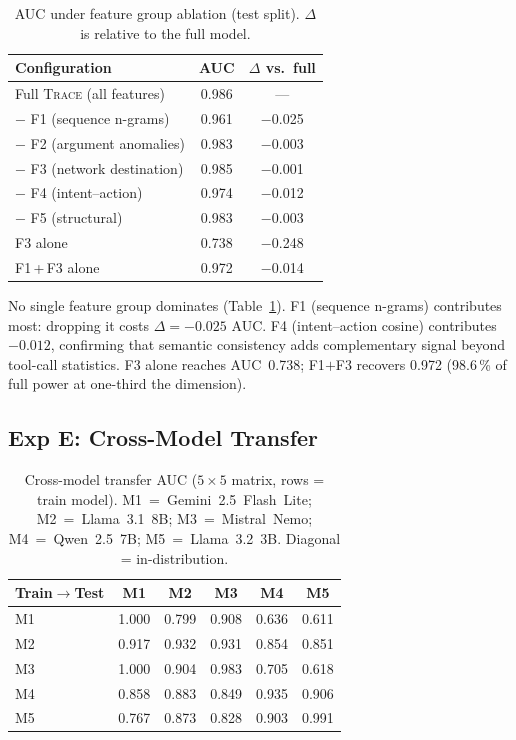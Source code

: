 \documentclass[conference]{IEEEtran}
\begin{document}
\begin{table}[t]
\centering
\caption{AUC under feature group ablation (test split).
  $\Delta$ is relative to the full model.}
\label{tab:ablation}
\begin{tabular}{lcc}
\toprule
Configuration & AUC & $\Delta$ vs.\ full \\
\midrule
Full \textsc{Trace} (all features)  & 0.986 & --- \\
\quad $-$ F1 (sequence n-grams)     & 0.961 & $-$0.025 \\
\quad $-$ F2 (argument anomalies)   & 0.983 & $-$0.003 \\
\quad $-$ F3 (network destination)  & 0.985 & $-$0.001 \\
\quad $-$ F4 (intent--action)       & 0.974 & $-$0.012 \\
\quad $-$ F5 (structural)           & 0.983 & $-$0.003 \\
\midrule
F3 alone                            & 0.738 & $-$0.248 \\
F1\,+\,F3 alone                     & 0.972 & $-$0.014 \\
\bottomrule
\end{tabular}
\end{table}

No single feature group dominates (Table~\ref{tab:ablation}).
F1 (sequence n-grams) contributes most: dropping it costs
$\Delta{=}{-}0.025$ AUC.  F4 (intent--action cosine) contributes
$-0.012$, confirming that semantic consistency adds complementary
signal beyond tool-call statistics.  F3 alone reaches AUC~0.738;
F1$+$F3 recovers 0.972 (98.6\,\% of full power at one-third the
dimension).  
\subsection{Exp E: Cross-Model Transfer}
\label{sec:exp_e}

\begin{table}[t]
\centering
\caption{Cross-model transfer AUC ($5{\times}5$ matrix, rows = train model).
  M1~=~Gemini~2.5~Flash~Lite; M2~=~Llama~3.1~8B; M3~=~Mistral~Nemo;
  M4~=~Qwen~2.5~7B; M5~=~Llama~3.2~3B.  Diagonal = in-distribution.}
\label{tab:transfer}
\begin{tabular}{lccccc}
\toprule
Train$\!\to$Test & M1 & M2 & M3 & M4 & M5 \\
\midrule
M1 & 1.000 & 0.799 & 0.908 & 0.636 & 0.611 \\
M2 & 0.917 & 0.932 & 0.931 & 0.854 & 0.851 \\
M3 & 1.000 & 0.904 & 0.983 & 0.705 & 0.618 \\
M4 & 0.858 & 0.883 & 0.849 & 0.935 & 0.906 \\
M5 & 0.767 & 0.873 & 0.828 & 0.903 & 0.991 \\
\bottomrule
\end{tabular}
\end{table}
\end{document}
